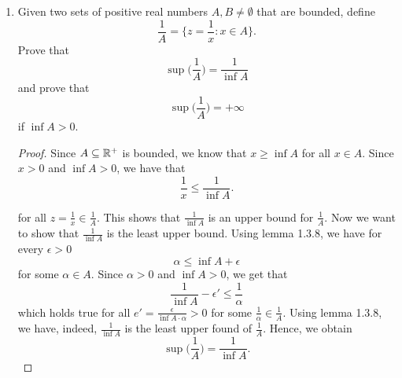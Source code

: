 \begin{enumerate}
\item 


Given two sets of positive real numbers \( A,B \neq \emptyset \) that are bounded, define 
\[ \frac{1}{A } = \bigg\{ z = \frac{1}{x} : x \in A \bigg\}.\]
Prove that 
\[ \sup \bigg(\frac{ 1}{A}\bigg) = \frac{ 1 }{\inf A }\]
and prove that 
\[ \sup \Big( \frac{1}{A}\Big) = +\infty \]
if \( \inf A > 0 \).
\begin{proof}
Since \( A \subseteq \mathbb{R}^+\) is bounded, we know that \( x \geq \inf A \) for all \( x \in A \). Since \( x > 0 \) and \( \inf A > 0 \), we have that 
\[ \frac{1}{x} \leq \frac{1}{\inf A}.\]

for all \( z = \frac{1}{x} \in \frac{1}{A}\). This shows that \( \frac{ 1}{ \inf A }\) is an upper bound for \( \frac{1}{A}\). Now we want to show that \( \frac{1 }{\inf A } \) is the least upper bound. Using lemma 1.3.8, we have for every \( \epsilon > 0 \)
\[ \alpha \leq \inf A + \epsilon \]
for some \( \alpha \in A \). Since \( \alpha > 0 \) and \( \inf A > 0 \), we get that 
\[ \frac{1}{\inf A} - \epsilon' \leq \frac{1}{\alpha}\]
which holds true for all \( e' = \frac{ \epsilon }{\inf A \cdot \alpha} > 0\) for some
\( \frac{1}{\alpha} \in \frac{1}{A}\). Using lemma 1.3.8, we have, indeed, \( \frac{ 1}{\inf A }\) is the least upper found of \( \frac{1}{A}\). Hence, we obtain 
\[ \sup \Big( \frac{1}{A}\Big) = \frac{1}{\inf A }.\]
\end{proof} 
    \end{enumerate}
    










% 

